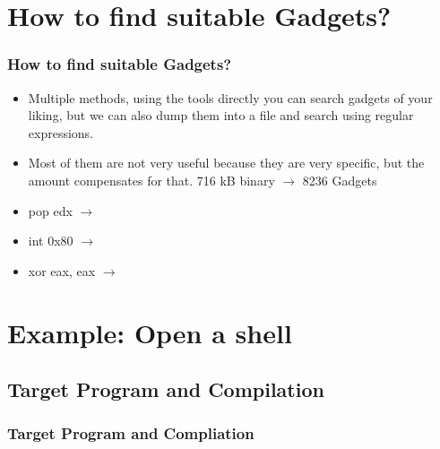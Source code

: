 \documentclass[11pt]{beamer}
\begin{document}
\section{How to find suitable Gadgets?}
\begin{frame}
    \frametitle{How to find suitable Gadgets?}
    \begin{itemize}
    \item Multiple methods, using the tools directly you can search gadgets of your liking, but we can also dump them into a file and search using regular expressions.
    \end{itemize}
    \begin{itemize}
        \item Most of them are not very useful because they are very specific, but the amount compensates for that. 716 kB binary $\rightarrow$ 8236 Gadgets
        \item pop edx $\rightarrow$ 
        \item int 0x80 $\rightarrow$ 
        \item xor eax, eax $\rightarrow$ 
    \end{itemize}
\end{frame}

\section{Example: Open a shell}
\subsection{Target Program and Compilation}
\begin{frame}[fragile]
    \frametitle{Target Program and Compliation}
\end{frame}
\end{document}
